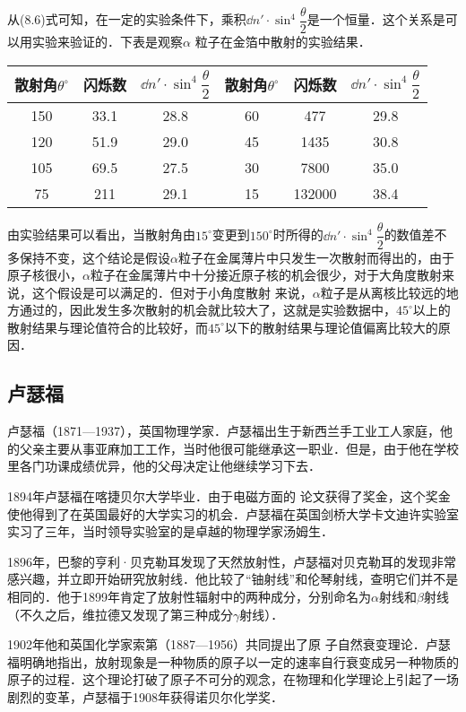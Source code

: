 从(8.6)式可知，在一定的实验条件下，乘积$\dd n'\cdot \sin^4\dfrac{\theta}{2}$是一个恒量．这个关系是可以用实验来验证的．下表是观察$\alpha$
粒子在金箔中散射的实验结果．

\begin{center}
\begin{tabular}{ccc||ccc}
    \hline
    散射角$\theta^{\circ}$  & 闪烁数  &  $\dd n'\cdot \sin^4\dfrac{\theta}{2}$ & 散射角$\theta^{\circ}$  & 闪烁数  &  $\dd n'\cdot \sin^4\dfrac{\theta}{2}$\\
    \hline
    150&    33.1&    28.8&    60&    477&    29.8\\
    120&51.9&29.0&45&1435&30.8\\
    105&69.5&27.5&30&7800&35.0\\
75&211&29.1&15&132000&38.4\\
\hline
\end{tabular}
\end{center}


由实验结果可以看出，当散射角由$15^{\circ}$变更到$150^{\circ}$时所得的$\dd n'\cdot \sin^4\dfrac{\theta}{2}$的数值差不多保持不变，这个结论是假设$\alpha$粒子在金属薄片中只发生一次散射而得出的，由于原子核很小，$\alpha$粒子在金属薄片中十分接近原子核的机会很少，对于大角度散射来说，这个假设是可以满足的．但对于小角度散射
来说，$\alpha$粒子是从离核比较远的地方通过的，因此发生多次散射的机会就比较大了，这就是实验数据中，$45^{\circ}$以上的散射结果与理论值符合的比较好，而$45^{\circ}$以下的散射结果与理论值偏离比较大的原因．


\subsection{卢瑟福}
卢瑟福（1871—1937），英国物理学家．卢瑟福出生于新西兰手工业工人家庭，他的父亲主要从事亚麻加工工作，当时他很可能继承这一职业．但是，由于他在学校里各门功课成绩优异，他的父母决定让他继续学习下去．

1894年卢瑟福在喀捷贝尔大学毕业．由于电磁方面的
论文获得了奖金，这个奖金使他得到了在英国最好的大学实习的机会．卢瑟福在英国剑桥大学卡文迪许实验室实习了三年，当时领导实验室的是卓越的物理学家汤姆生．

1896年，巴黎的亨利·贝克勒耳发现了天然放射性，卢瑟福对贝克勒耳的发现非常感兴趣，并立即开始研究放射线．他比较了“铀射线”和伦琴射线，查明它们并不是相同的．他于1899年肯定了放射性辐射中的两种成分，分别命名为$\alpha$射线和$\beta$射线（不久之后，维拉德又发现了第三种成分$\gamma$射线）．

1902年他和英国化学家索第（1887—1956）共同提出了原
子自然衰变理论．卢瑟福明确地指出，放射现象是一种物质的原子以一定的速率自行衰变成另一种物质的原子的过程．这个理论打破了原子不可分的观念，在物理和化学理论上引起了一场剧烈的变革，卢瑟福于1908年获得诺贝尔化学奖．

